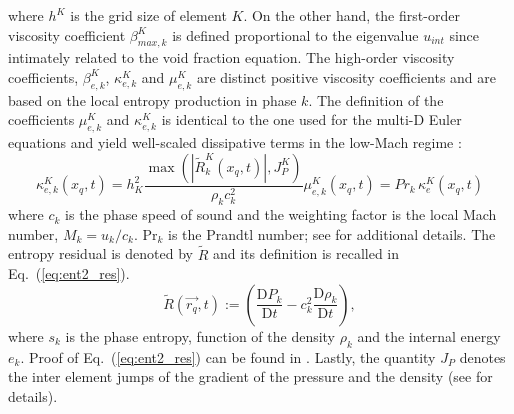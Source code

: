 \documentclass{anstrans}
\newcommand{\grad}{\vec{\nabla}}
\renewcommand{\Pr}{\textrm{Pr}}
\newcommand{\resi}{R}
\newcommand{\resinew}{\widetilde{\resi}}
\newcommand{\matder}[1]{\frac{\textrm{D} #1}{\textrm{D} t}}
\newcommand{\eqt}[1]{Eq.~(\ref{#1})}                     %
\begin{document}
%
where $h^K$ is the grid size of element $K$. On the other hand, the first-order viscosity coefficient $\beta^K_{max,k}$ is defined proportional to the eigenvalue $u_{int}$ since intimately related to the void fraction equation. The high-order viscosity coefficients, $\beta^K_{e,k}$, $\kappa^K_{e,k}$ and $\mu^K_{e,k}$ are distinct positive viscosity coefficients and are based on the local entropy production in phase $k$. The definition of the coefficients $\mu^K_{e,k}$ and $\kappa^K_{e,k}$ is identical to the one used for the multi-D Euler equations \cite{marco_inl_report} and yield well-scaled dissipative terms in the low-Mach regime \cite{LowMach1, LowMach2, LowMach3}:
%
\begin{subequations}
\label{eq:ent_visc_coeff2}
\begin{equation}
\kappa^K_{e,k}(x_q,t) =  h_K^2 \frac{\max \left( | \resinew_k^K(x_q,t) |, J_P^K \right)}{\rho_k c_k^2}  
\end{equation}
\begin{equation}
\mu^K_{e,k}(x_q,t) = Pr_k \, \kappa^K_e(x_q,t)
\end{equation}
\end{subequations}
%
where $c_k$ is the phase speed of sound and the weighting factor is the local Mach number, $M_k=u_k/c_k$. $\Pr_k$ is the Prandtl number; see \cite{jlg1} for additional details. The entropy residual is denoted by $\resinew$ and its definition is recalled in \eqt{eq:ent2_res}.  
%
\begin{equation}
\label{eq:ent2_res}
\resinew(\vec{r_q},t) := \left( \matder{P_k} - c^2_k \matder{\rho_k} \right) , %
\end{equation} 
%
where $s_k$ is the phase entropy, function of the density $\rho_k$ and the internal energy $e_k$. Proof of \eqt{eq:ent2_res} can be found in \cite{marco_inl_report}. Lastly, the quantity $J_P$ denotes the inter element jumps of the gradient of the pressure and the density (see \cite{marco_inl_report} for details).
\end{document}
